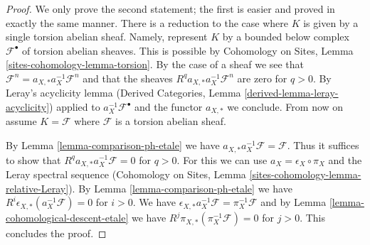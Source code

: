 \documentclass{stacks-project}
\theoremstyle{plain}
\theoremstyle{definition}
\theoremstyle{remark}
\numberwithin{equation}{subsection}
\begin{document}
\begin{proof}
We only prove the second statement; the first is easier and proved in exactly
the same manner. There is a reduction to the case where
$K$ is given by a single torsion abelian sheaf. Namely, represent $K$
by a bounded below complex $\mathcal{F}^\bullet$ of torsion
abelian sheaves. This is possible by Cohomology on Sites, Lemma
\ref{sites-cohomology-lemma-torsion}.
By the case of a sheaf we see that
$\mathcal{F}^n = a_{X, *} a_X^{-1} \mathcal{F}^n$
and that the sheaves $R^qa_{X, *}a_X^{-1}\mathcal{F}^n$
are zero for $q > 0$. By Leray's acyclicity lemma
(Derived Categories, Lemma \ref{derived-lemma-leray-acyclicity})
applied to $a_X^{-1}\mathcal{F}^\bullet$
and the functor $a_{X, *}$ we conclude. From now on assume
$K = \mathcal{F}$ where $\mathcal{F}$ is a torsion abelian sheaf.

\medskip\noindent
By Lemma \ref{lemma-comparison-ph-etale} we have
$a_{X, *}a_X^{-1}\mathcal{F} = \mathcal{F}$. Thus it suffices to show that
$R^qa_{X, *}a_X^{-1}\mathcal{F} = 0$ for $q > 0$.
For this we can use $a_X = \epsilon_X \circ \pi_X$ and
the Leray spectral sequence
(Cohomology on Sites, Lemma \ref{sites-cohomology-lemma-relative-Leray}).
By Lemma \ref{lemma-comparison-ph-etale}
we have $R^i\epsilon_{X, *}(a_X^{-1}\mathcal{F}) = 0$ for $i > 0$.
We have
$\epsilon_{X, *}a_X^{-1}\mathcal{F} = \pi_X^{-1}\mathcal{F}$
and by Lemma \ref{lemma-cohomological-descent-etale} we have
$R^j\pi_{X, *}(\pi_X^{-1}\mathcal{F}) = 0$ for $j > 0$.
This concludes the proof.
\end{proof}
\end{document}
